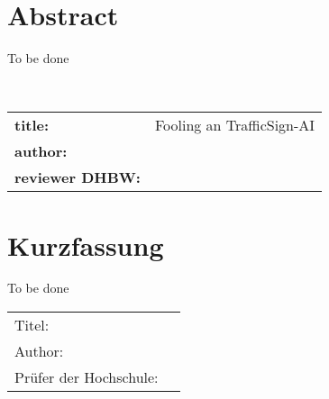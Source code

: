 \chapter*{Abstract} %
To be done

~\newline
~\newline
\begin{flushleft}
	\begin{tabular}{ll}
		\textbf{title:} &\quad Fooling an TrafficSign-AI \\
		\textbf{author:}  &\quad \autor \\
		\textbf{reviewer DHBW:} &\quad \betreuerth \\
		[6ex]%
	\end{tabular} 
\end{flushleft}


\chapter*{Kurzfassung} 
To be done
~\newline
\begin{flushleft}
	\begin{tabular}{ll}
		Titel:& \quad \titel \\ 
		Author:& \quad \autor \\
		Prüfer der Hochschule: & \quad \betreuerth \\ 
		[6ex]%
	\end{tabular} 
\end{flushleft}